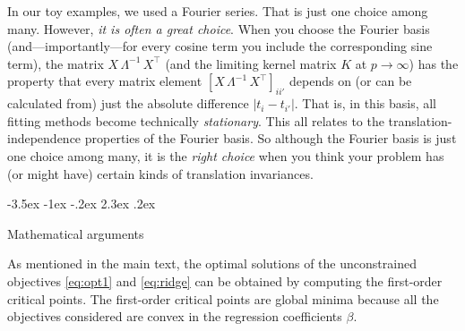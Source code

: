 \documentclass[12pt,letterpaper]{article}
\makeatletter
\renewcommand\section{\@startsection {section}{1}{\z@}%
  {-3.5ex \@plus -1ex \@minus -.2ex}%
  {2.3ex \@plus.2ex}%
  {\raggedright\normalfont\Large\bfseries}}
\makeatother
\begin{document}
In our toy examples, we used a Fourier series.
That is just one choice among many.
However, \emph{it is often a great choice}.
When you choose the Fourier basis (and---importantly---for every cosine term you include the corresponding sine term), the matrix $X\,\Lambda^{-1}\,X^\top$ (and the limiting kernel matrix $K$ at $p\rightarrow\infty$) has the property that every matrix element $[X\,\Lambda^{-1}\,X^\top]_{ii'}$ depends on (or can be calculated from) just the absolute difference $|t_i-t_{i'}|$.
That is, in this basis, all fitting methods become technically \emph{stationary}.
This all relates to the translation-independence properties of the Fourier basis.
So although the Fourier basis is just one choice among many, it is the \emph{right choice} when you think your problem has (or might have) certain kinds of translation invariances.


{\raggedright
\setlength{\bibsep}{0pt plus 0.3ex} %


}

\appendix
\section{Mathematical arguments}\label{app:math}

As mentioned in the main text, the optimal solutions of the unconstrained objectives \eqref{eq:opt1} and \eqref{eq:ridge} can be obtained by computing the first-order critical points. The first-order critical points are global minima because all the objectives considered are convex in the regression coefficients $\beta$.
\end{document}
